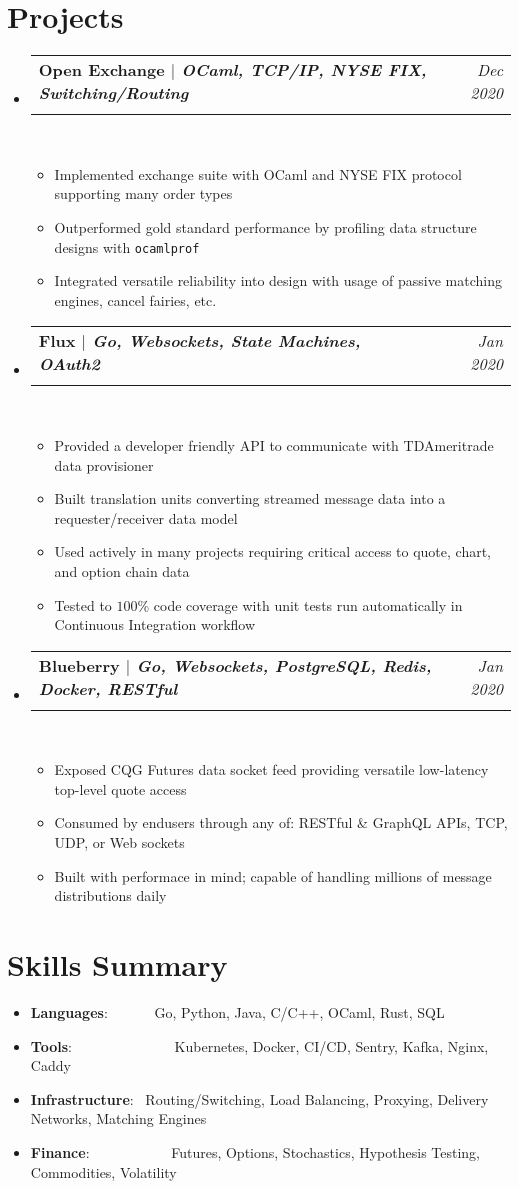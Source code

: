 \documentclass[a4paper,12pt]{extarticle}
\makeatletter
\newcommand{\resumeSkillItem}[2]{
	\item\small{
		\textbf{#1}{: #2 \vspace{-2pt}}
	}
}
\newcommand{\resumeItem}[1]{
	\item\small{
		#1 \vspace{-2pt}
	}
}
\newcommand{\resumeSubheading}[4]{
	\vspace{-1pt}\item
		\begin{tabular*}{0.97\textwidth}{l@{\extracolsep{\fill}}r}
			\textbf{#1} & #2 \\
			\textit{#3} & \textit{#4} \\
		\end{tabular*}\vspace{-5pt}
}
\newcommand{\resumeSubItem}[2]{\resumeSkillItem{#1}{#2}\vspace{-5pt}}
\newcommand{\resumeSubHeadingListStart}{\begin{itemize}[leftmargin=0.15in,label={}]}
\newcommand{\resumeSubHeadingListEnd}{\end{itemize}}
\newcommand{\resumeItemListStart}{\begin{itemize}\vspace{-3pt}}
\newcommand{\resumeItemListEnd}{\end{itemize}\vspace{-5pt}}
\makeatother
\begin{document}
\section{Projects}
	\resumeSubHeadingListStart
		\resumeSubheading{Open Exchange $|$ 
		{\normalfont \small \textit 
		{OCaml, TCP/IP, NYSE FIX, Switching/Routing}}}
		{\textit{Dec 2020}}{}{}\\[-10pt]
		\resumeItemListStart
			\resumeItem{Implemented exchange suite with OCaml and NYSE
				FIX protocol supporting many order types}
			\resumeItem{Outperformed gold standard performance by profiling
				data structure designs with \texttt{ocamlprof}}
			\resumeItem{Integrated versatile reliability into design with 
				usage of passive matching engines, cancel fairies, etc.}
		\resumeItemListEnd
		\resumeSubheading{Flux $|$ 
		{\normalfont \small \textit 
		{Go, Websockets, State Machines, OAuth2}}}
		{\textit{Jan 2020}}{}{}\\[-10pt]
		\resumeItemListStart
			\resumeItem{Provided a developer friendly API to communicate with
				TDAmeritrade data provisioner}
			\resumeItem{Built translation units converting streamed message
				data into a requester/receiver data model}
			\resumeItem{Used actively in many projects requiring critical
				access to quote, chart, and option chain data}
			\resumeItem{Tested to $100$\% code coverage with unit tests 
				run automatically in Continuous Integration workflow}
		\resumeItemListEnd
		\resumeSubheading{Blueberry $|$ 
		{\normalfont \small \textit 
		{Go, Websockets, PostgreSQL, Redis, Docker, RESTful}}}
		{\textit{Jan 2020}}{}{}\\[-10pt]
		\resumeItemListStart
			\resumeItem{Exposed CQG Futures data socket 
			feed providing versatile low-latency top-level quote access}
			\resumeItem{Consumed by endusers through any of:
			RESTful \& GraphQL APIs, TCP, UDP, or Web sockets}
			\resumeItem{Built with performace in mind; capable of handling
			millions of message distributions daily}
		\resumeItemListEnd
	\resumeSubHeadingListEnd
\vspace{-5mm}
\section{Skills Summary}
	\resumeSubHeadingListStart
		\resumeSubItem{Languages}
			{~~~~~~Go, Python, Java, C/C++, OCaml, Rust, SQL}
		\resumeSubItem{Tools}
			{~~~~~~~~~~~~~~Kubernetes, Docker, CI/CD, Sentry, Kafka, Nginx,
			Caddy}
		\resumeSubItem{Infrastructure}
			{~Routing/Switching, Load Balancing, Proxying, Delivery Networks,
			 Matching Engines}
		\resumeSubItem{Finance}
			{~~~~~~~~~~~Futures, Options, Stochastics, Hypothesis Testing,
			Commodities, Volatility}
	\resumeSubHeadingListEnd
\end{document}
